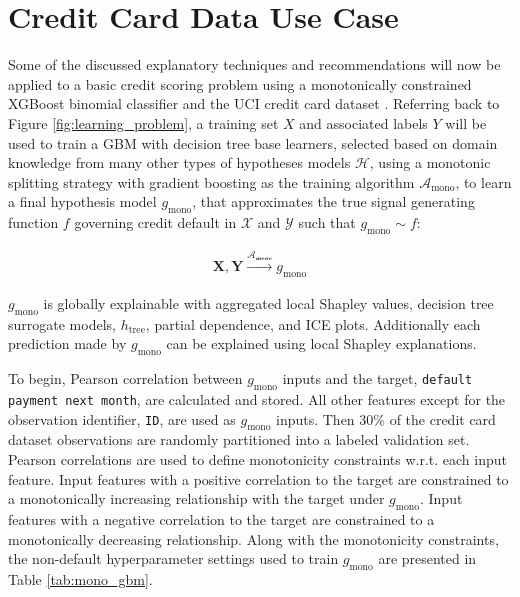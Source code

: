 \documentclass[11pt]{asaproc}
\begin{document}
\section{Credit Card Data Use Case} \label{sec:use_case}

Some of the discussed explanatory techniques and recommendations will now be applied to a basic credit scoring problem using a monotonically constrained XGBoost binomial classifier and the UCI credit card dataset \cite{uci}. Referring back to Figure \ref{fig:learning_problem}, a training set $X$ and associated labels $Y$ will be used to train a GBM with decision tree base learners, selected based on domain knowledge from many other types of hypotheses models $\mathcal{H}$, using a monotonic splitting strategy with gradient boosting as the training algorithm $\mathcal{A}_{\text{mono}}$, to learn a final hypothesis model $g_{\text{mono}}$, that approximates the true signal generating function $f$ governing credit default in $\mathcal{X}$ and $\mathcal{Y}$ such that $g_{\text{mono}} \sim f$:

\begin{equation}
\label{eq:cc_training}
\begin{aligned}
\mathbf{X}, \mathbf{Y} \xrightarrow{\mathcal{A_{\text{mono}}}} g_{\text{mono}}
\end{aligned}
\end{equation}

\noindent$g_{\text{mono}}$ is globally explainable with aggregated local Shapley values, decision tree surrogate models, $h_{\text{tree}}$, partial dependence, and ICE plots. Additionally each prediction made by $g_{\text{mono}}$ can be explained using local Shapley explanations. 

To begin, Pearson correlation between $g_{\text{mono}}$ inputs and the target, \texttt{default payment next month}, are calculated and stored. All other features except for the observation identifier, \texttt{ID}, are used as $g_{\text{mono}}$ inputs. Then 30\% of the credit card dataset observations are randomly partitioned into a labeled validation set. Pearson correlations are used to define monotonicity constraints w.r.t. each input feature. Input features with a positive correlation to the target are constrained to a monotonically increasing relationship with the target under $g_{\text{mono}}$. Input features with a negative correlation to the target are constrained to a monotonically decreasing relationship. Along with the monotonicity constraints, the non-default hyperparameter settings used to train $g_{\text{mono}}$ are presented in Table \ref{tab:mono_gbm}. 
\end{document}
